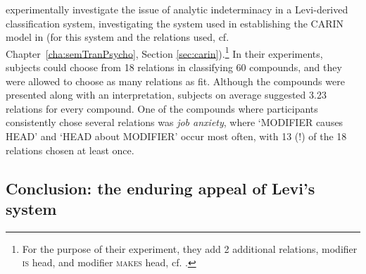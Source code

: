 \citet{DevereuxandCostello:2005} experimentally investigate the issue
of analytic indeterminacy in a Levi-derived classification system, investigating
the system used in establishing the CARIN model in
\citet{GagneandShoben:1997} (for this system and the relations used, cf. Chapter\ \ref{cha:semTranPsycho}, Section \ref{sec:carin}).\footnote{For the
  purpose of their experiment, they add 2 additional relations,
  modifier \textsc{is} head, and modifier \textsc{makes} head,
  cf. \citet[495]{DevereuxandCostello:2005}.} 
In their experiments,
subjects could choose from 18 relations in classifying 60 compounds,
and they were allowed to choose as many relations as fit. Although the
compounds were presented along with an interpretation, subjects on
average suggested 3.23 relations for every compound. One of the
compounds where participants consistently chose several relations was \emph{job anxiety}, where `MODIFIER causes HEAD' and `HEAD about MODIFIER' occur most
often, with 13 (!) of the 18 relations chosen at least once.

\subsection{Conclusion: the enduring appeal of Levi's system}
\label{sec:semrel-compound-classification}

